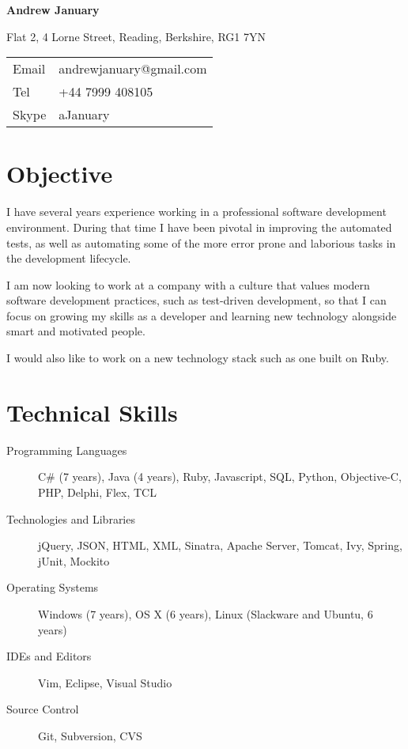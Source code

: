 \documentclass[10pt]{report}
\begin{document}
\textbf{{\Huge Andrew January}}

Flat 2, 4 Lorne Street, Reading, Berkshire, RG1 7YN

\begin {tabular}{ll}
Email&andrewjanuary@gmail.com \\
Tel&+44 7999 408105 \\
Skype&aJanuary
\end{tabular}

\section*{Objective}
I have several years experience working in a professional software development environment. During that time I have been pivotal in improving the automated tests, as well as automating some of the more error prone and laborious tasks in the development lifecycle.

I am now looking to work at a company with a culture that values modern software development practices, such as test-driven development, so that I can focus on growing my skills as a developer and learning new technology alongside smart and motivated people.

I would also like to work on a new technology stack such as one built on Ruby.

\section*{Technical Skills}
\begin{description}
  \item[Programming Languages]
    C\# (7 years), Java (4 years), Ruby, Javascript, SQL, Python, \mbox{Objective-C}, PHP, Delphi, Flex, TCL
  \item[Technologies and Libraries]
    jQuery, JSON, HTML, XML, Sinatra, Apache Server, Tomcat, Ivy, Spring, jUnit, Mockito
  \item[Operating Systems]
    Windows (7 years), OS X (6 years), Linux (Slackware and Ubuntu, 6 years)
  \item[IDEs and Editors]
    Vim, Eclipse, Visual Studio
  \item[Source Control]
    Git, Subversion, CVS
\end{description}
\end{document}
